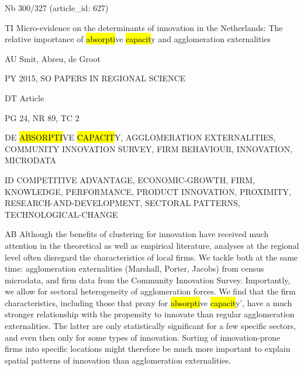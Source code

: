 \documentclass[a4paper]{article}
\begin{document}
\vspace*{-2cm}
Nb \tabto{0cm}300/327 (article\_id: 627)\par
TI \tabto{0cm}Micro-evidence on the determinants of innovation in the Netherlands: The relative importance of \hl{absorpti}ve \hl{capacit}y and agglomeration externalities\par
AU \tabto{0cm}Smit, Abreu, de Groot\par
PY \tabto{0cm}2015, SO PAPERS IN REGIONAL SCIENCE\par
DT \tabto{0cm}Article\par
PG \tabto{0cm}24, NR 89, TC 2\par
DE \tabto{0cm}\hl{ABSORPTI}VE \hl{CAPACIT}Y, AGGLOMERATION EXTERNALITIES, COMMUNITY INNOVATION SURVEY, FIRM BEHAVIOUR, INNOVATION, MICRODATA\par
ID \tabto{0cm}COMPETITIVE ADVANTAGE, ECONOMIC-GROWTH, FIRM, KNOWLEDGE, PERFORMANCE, PRODUCT INNOVATION, PROXIMITY, RESEARCH-AND-DEVELOPMENT, SECTORAL PATTERNS, TECHNOLOGICAL-CHANGE\par
AB \tabto{0cm}Although the benefits of clustering for innovation have received much attention in the theoretical as well as empirical literature, analyses at the regional level often disregard the characteristics of local firms. We tackle both at the same time: agglomeration externalities (Marshall, Porter, Jacobs) from census microdata, and firm data from the Community Innovation Survey. Importantly, we allow for sectoral heterogeneity of agglomeration forces. We find that the firm characteristics, including those that proxy for \hl{absorpti}ve \hl{capacit}y', have a much stronger relationship with the propensity to innovate than regular agglomeration externalities. The latter are only statistically significant for a few specific sectors, and even then only for some types of innovation. Sorting of innovation-prone firms into specific locations might therefore be much more important to explain spatial patterns of innovation than agglomeration externalities.\par
\clearpage
\end{document}
